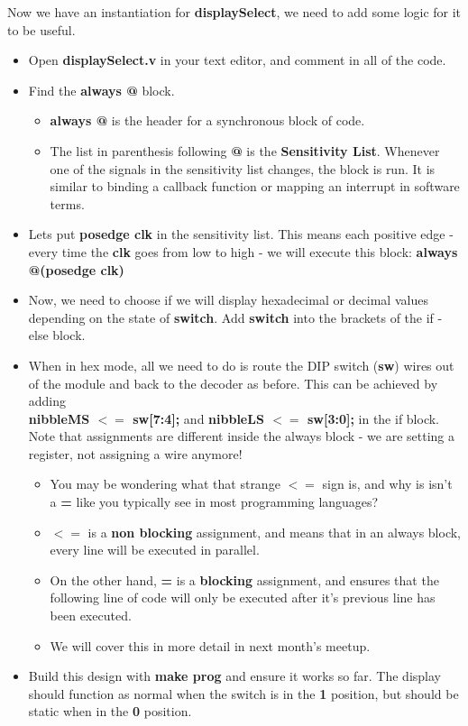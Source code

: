 \documentclass[12pt,a4paper]{article}
\begin{document}
\noindent
Now we have an instantiation for \textbf{displaySelect}, we need to add some logic for it to be useful.
\begin{itemize}
	\item Open \textbf{displaySelect.v} in your text editor, and comment in all of the code. 
	\item Find the \textbf{always @} block.
	\begin{itemize}
		\item \textbf{always @} is the header for a synchronous block of code.
		\item The list in parenthesis following \textbf{@} is the \textbf{Sensitivity List}. Whenever one of the signals in the sensitivity list changes, the block is run. It is similar to binding a callback function or mapping an interrupt in software terms. 
	\end{itemize} 
		\item Lets put \textbf{posedge clk} in the sensitivity list. This means each positive edge - every time the \textbf{clk} goes from low to high - we will execute this block: \textbf{always @(posedge clk)}
		\item Now, we need to choose if we will display hexadecimal or decimal values depending on the state of \textbf{switch}. Add \textbf{switch} into the brackets of the if - else block. 
		\item When in hex mode, all we need to do is route the DIP switch (\textbf{sw}) wires out of the module and back to the decoder as before. This can be achieved by adding \\ \textbf{nibbleMS $<=$ sw[7:4];} and \textbf{nibbleLS $<=$ sw[3:0];} in the if block. Note that assignments are different inside the always block - we are setting a register, not assigning a wire anymore! 
		\begin{itemize}
			\item You may be wondering what that strange \textbf{$<=$} sign is, and why is isn't a \textbf{=} like you typically see in most programming languages?
			\item \textbf{$<=$} is a \textbf{non blocking} assignment, and means that in an always block, every line will be executed in parallel. 
			\item On the other hand, \textbf{=} is a \textbf{blocking} assignment, and ensures that the following line of code will only be executed after it's previous line has been executed. 
			\item We will cover this in more detail in next month's meetup.
		\end{itemize}
		\item Build this design with \textbf{make prog} and ensure it works so far. The display should function as normal when the switch is in the \textbf{1} position, but should be static when in the \textbf{0} position. 
	\end{itemize}
\end{document}
